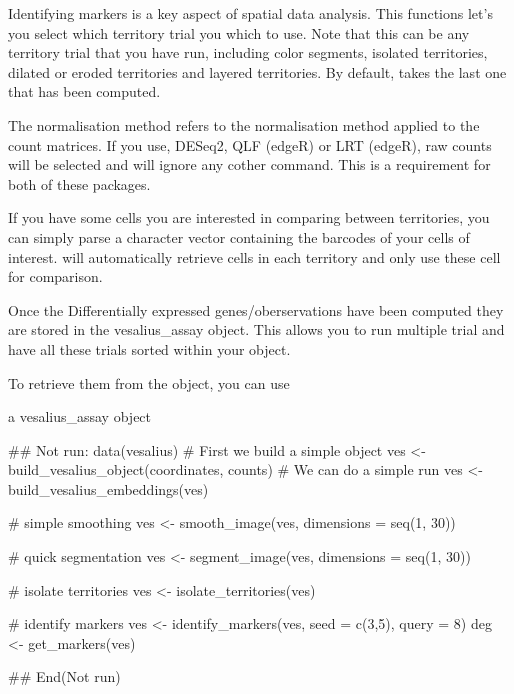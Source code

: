 \documentclass[a4paper]{book}
\begin{document}
%
\begin{Details}
Identifying markers is a key aspect of spatial data analysis. 
This functions let's you select which territory trial you which to use.
Note that this can be any territory trial that you have run, including 
color segments, isolated territories, dilated or eroded territories and
layered territories. By default,  takes the last 
one that has been computed.

The normalisation method refers to the normalisation method applied to
the count matrices. If you use, DESeq2, QLF (edgeR) or LRT (edgeR), 
raw counts will be selected and will ignore any cother command. 
This is a requirement for both of these packages.

If you have some cells you are interested in comparing between territories,
you can simply parse a character vector containing the barcodes of your 
cells of interest.  will automatically retrieve cells
in each territory and only use these cell for comparison.

Once the Differentially expressed genes/oberservations have been computed 
they are stored in the vesalius\_assay object. This allows you to run multiple
trial and have all these trials sorted within your object.

To retrieve them from the object, you can use 
\end{Details}
%
\begin{Value}
a vesalius\_assay object
\end{Value}
%
\begin{Examples}
\begin{ExampleCode}
## Not run: 
data(vesalius)
# First we build a simple object
ves <- build_vesalius_object(coordinates, counts)
# We can do a simple run
ves <- build_vesalius_embeddings(ves)

# simple smoothing
ves <- smooth_image(ves, dimensions = seq(1, 30))

# quick segmentation
ves <- segment_image(ves, dimensions = seq(1, 30))

# isolate territories
ves <- isolate_territories(ves)

# identify markers
ves <- identify_markers(ves, seed = c(3,5), query = 8)
deg <- get_markers(ves)

## End(Not run)
\end{ExampleCode}
\end{Examples}
\end{document}
